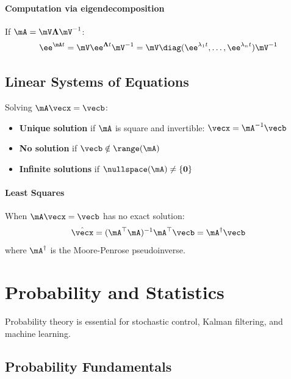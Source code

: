 \subsubsection{Computation via eigendecomposition}
If $\mA = \mV\boldsymbol{\Lambda}\mV^{-1}$:
\begin{equation}
\ee^{\mA t} = \mV\ee^{\boldsymbol{\Lambda} t}\mV^{-1} = \mV\diag(\ee^{\lambda_1 t}, \ldots, \ee^{\lambda_n t})\mV^{-1}
\end{equation}

\section{Linear Systems of Equations}

Solving $\mA\vecx = \vecb$:
\begin{itemize}
    \item \textbf{Unique solution} if $\mA$ is square and invertible: $\vecx = \mA^{-1}\vecb$
    \item \textbf{No solution} if $\vecb \notin \range(\mA)$
    \item \textbf{Infinite solutions} if $\nullspace(\mA) \neq \{\mathbf{0}\}$
\end{itemize}

\subsubsection{Least Squares}
When $\mA\vecx = \vecb$ has no exact solution:
\begin{equation}
\hat{\vecx} = (\mA^\top\mA)^{-1}\mA^\top\vecb = \mA^\dagger\vecb
\end{equation}
where $\mA^\dagger$ is the Moore-Penrose pseudoinverse.

\chapter{Probability and Statistics}
\label{ch:probability}

Probability theory is essential for stochastic control, Kalman filtering, and machine learning.

\section{Probability Fundamentals}

